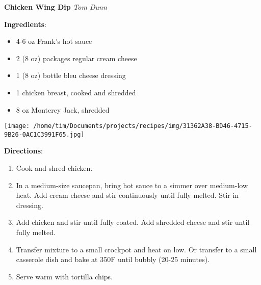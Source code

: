 \documentclass[11pt, twoside, openany]{book}
\begin{document}
\noindent\begin{minipage}[t]{\linewidth}%
{\Large\textbf{Chicken Wing Dip}} \label{chicken-wing-dip}\hfill\textit{Tom Dunn}\\
\noindent\begin{minipage}[t]{0.78\linewidth}%
\textbf{Ingredients}:\vspace{-3mm}
\begin{multicols}{2}
\begin{itemize}\setlength\itemsep{-1mm}
\item 4-6 oz Frank's hot sauce
\item 2 (8 oz) packages regular cream cheese
\item 1 (8 oz) bottle bleu cheese dressing
\item 1 chicken breast, cooked and shredded
\item 8 oz Monterey Jack, shredded
\end{itemize}
\end{multicols}
\end{minipage}
\noindent\begin{minipage}[t]{0.18\linewidth}
\centering \strut\vspace*{-\baselineskip}\newline
\texttt{[image: /home/tim/Documents/projects/recipes/img/31362A38-BD46-4715-9B26-0AC1C3991F65.jpg]}\\
\end{minipage}\vspace{3mm}
\textbf{Directions}:
\vspace{-3mm}\begin{enumerate}\setlength\itemsep{-1mm}
\item Cook and shred chicken.
\item In a medium-size saucepan, bring hot sauce to a simmer over medium-low heat. Add cream cheese and stir continuously until fully melted. Stir in dressing.
\item Add chicken and stir until fully coated. Add shredded cheese and stir until fully melted.
\item Transfer mixture to a small crockpot and heat on low. Or transfer to a small casserole dish and bake at 350F until bubbly (20-25 minutes). 
\item Serve warm with tortilla chips.
\end{enumerate}
\end{minipage}\vspace{8mm}
\end{document}
